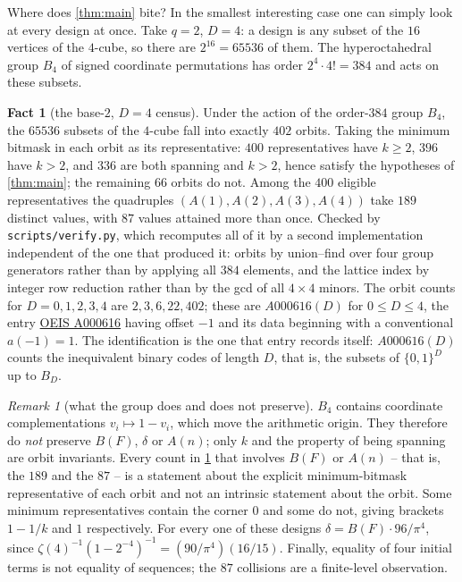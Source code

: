 \documentclass[11pt]{amsart}
\theoremstyle{definition}
\newtheorem{fact}[theorem]{Fact}
\theoremstyle{remark}
\newtheorem{remark}[theorem]{Remark}
\begin{document}
Where does \cref{thm:main} bite? In the smallest interesting case one can simply look at every design at once. Take $q=2$, $D=4$: a design is any subset of the $16$ vertices of the $4$-cube, so there are $2^{16} = 65536$ of them. The hyperoctahedral group $B_4$ of signed coordinate permutations has order $2^4 \cdot 4! = 384$ and acts on these subsets.

\begin{fact}[the base-$2$, $D=4$ census]
\label{fact:d4}
Under the action of the order-$384$ group $B_4$, the $65536$ subsets of the $4$-cube fall into exactly $402$ orbits. Taking the minimum bitmask in each orbit as its representative: $400$ representatives have $k \ge 2$, $396$ have $k > 2$, and $336$ are both spanning and $k>2$, hence satisfy the hypotheses of \cref{thm:main}; the remaining $66$ orbits do not. Among the $400$ eligible representatives the quadruples $(A(1),A(2),A(3),A(4))$ take $189$ distinct values, with $87$ values attained more than once. Checked by \texttt{scripts/verify.py}, which recomputes all of it by a second implementation independent of the one that produced it: orbits by union--find over four group generators rather than by applying all $384$ elements, and the lattice index by integer row reduction rather than by the gcd of all $4\times4$ minors. The orbit counts for $D = 0,1,2,3,4$ are $2, 3, 6, 22, 402$; these are $A000616(D)$ for $0 \le D \le 4$, the entry \href{https://oeis.org/A000616}{OEIS A000616} having offset $-1$ and its data beginning with a conventional $a(-1)=1$. The identification is the one that entry records itself: $A000616(D)$ counts the inequivalent binary codes of length $D$, that is, the subsets of $\{0,1\}^{D}$ up to $B_D$.
\end{fact}

\begin{remark}[what the group does and does not preserve]
\label{rem:orbit}
$B_4$ contains coordinate complementations $v_i \mapsto 1-v_i$, which move the arithmetic origin. They therefore do \emph{not} preserve $B(F)$, $\delta$ or $A(n)$; only $k$ and the property of being spanning are orbit invariants. Every count in \cref{fact:d4} that involves $B(F)$ or $A(n)$ -- that is, the $189$ and the $87$ -- is a statement about the explicit minimum-bitmask representative of each orbit and not an intrinsic statement about the orbit. Some minimum representatives contain the corner $0$ and some do not, giving brackets $1-1/k$ and $1$ respectively. For every one of these designs $\delta = B(F)\cdot 96/\pi^{4}$, since $\zeta(4)^{-1}(1-2^{-4})^{-1} = (90/\pi^{4})(16/15)$. Finally, equality of four initial terms is not equality of sequences; the $87$ collisions are a finite-level observation.
\end{remark}
\end{document}
